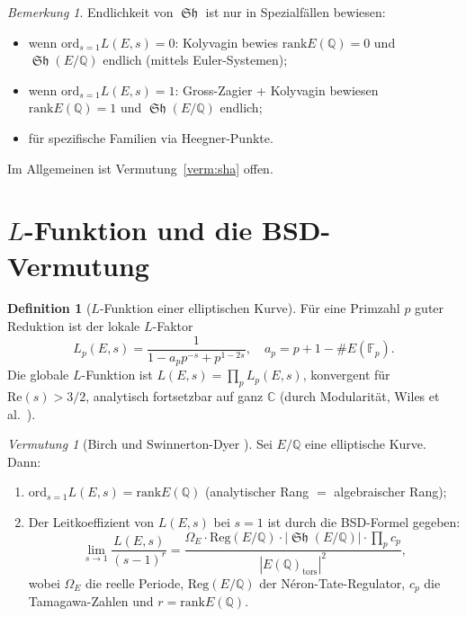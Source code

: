 \documentclass[12pt,a4paper]{amsart}
\theoremstyle{definition}
\newtheorem{definition_de}[theorem]{Definition}
\theoremstyle{remark}
\newtheorem{bemerkung}[theorem]{Bemerkung}
\newtheorem{vermutung}[theorem]{Vermutung}
\newcommand{\Q}{\mathbb{Q}}
\newcommand{\C}{\mathbb{C}}
\newcommand{\F}{\mathbb{F}}
\DeclareMathOperator{\Sha}{\mathfrak{Sh}}
\newcommand{\rank}{\mathrm{rank}}
\newcommand{\ord}{\mathrm{ord}}
\begin{document}
\begin{bemerkung}
  Endlichkeit von $\Sha$ ist nur in Spezialfällen bewiesen:
  \begin{itemize}
    \item wenn $\ord_{s=1}L(E,s) = 0$: Kolyvagin \cite{Kolyvagin1988} bewies $\rank E(\Q) = 0$ und $\Sha(E/\Q)$ endlich (mittels Euler-Systemen);
    \item wenn $\ord_{s=1}L(E,s) = 1$: Gross-Zagier \cite{GZ1986} + Kolyvagin bewiesen $\rank E(\Q) = 1$ und $\Sha(E/\Q)$ endlich;
    \item für spezifische Familien via Heegner-Punkte.
  \end{itemize}
  Im Allgemeinen ist Vermutung~\ref{verm:sha} offen.
\end{bemerkung}

\section{$L$-Funktion und die BSD-Vermutung}\label{sec:bsd}

\begin{definition_de}[$L$-Funktion einer elliptischen Kurve]
  Für eine Primzahl $p$ guter Reduktion ist der lokale $L$-Faktor
  \[
    L_p(E,s) = \frac{1}{1 - a_p p^{-s} + p^{1-2s}}, \quad
    a_p = p + 1 - \#E(\F_p).
  \]
  Die globale $L$-Funktion ist $L(E,s) = \prod_p L_p(E,s)$,
  konvergent für $\mathrm{Re}(s) > 3/2$, analytisch fortsetzbar auf ganz $\C$
  (durch Modularität, Wiles et al.\ \cite{BCDT2001}).
\end{definition_de}

\begin{vermutung}[Birch und Swinnerton-Dyer \cite{BSD1965}]\label{verm:bsd}
  Sei $E/\Q$ eine elliptische Kurve. Dann:
  \begin{enumerate}[label=(\roman*)]
    \item $\ord_{s=1} L(E,s) = \rank E(\Q)$ \quad (analytischer Rang $=$ algebraischer Rang);
    \item Der Leitkoeffizient von $L(E,s)$ bei $s=1$ ist durch die BSD-Formel gegeben:
    \[
      \lim_{s\to 1} \frac{L(E,s)}{(s-1)^r} =
      \frac{\Omega_E \cdot \mathrm{Reg}(E/\Q) \cdot |\Sha(E/\Q)| \cdot \prod_p c_p}
           {|E(\Q)_{\mathrm{tors}}|^2},
    \]
    wobei $\Omega_E$ die reelle Periode, $\mathrm{Reg}(E/\Q)$ der Néron-Tate-Regulator,
    $c_p$ die Tamagawa-Zahlen und $r = \rank E(\Q)$.
  \end{enumerate}
\end{vermutung}
\end{document}
